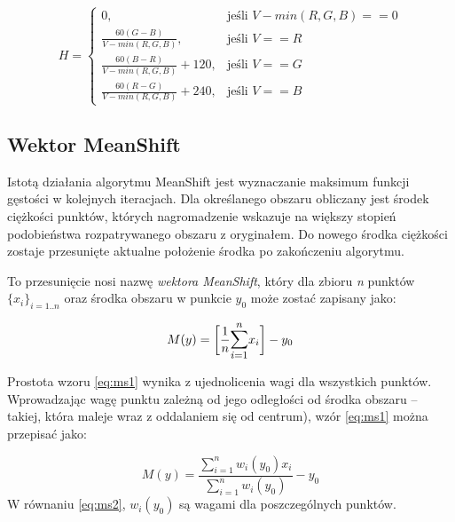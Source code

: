 \begin{equation}
\label{HSV_last}
H=\begin{cases}
	0, & \text{jeśli } V-min(R,G,B)==0 \\
	\frac{60(G-B)}{V-min(R,G,B)}, & \text{jeśli } V==R \\
	\frac{60(B-R)}{V-min(R,G,B)}+120, & \text{jeśli } V==G \\
	\frac{60(R-G)}{V-min(R,G,B)}+240, & \text{jeśli } V==B 
\end{cases}
\end{equation}



\subsection{Wektor MeanShift}
\label{ssec:MS}

Istotą działania algorytmu MeanShift jest wyznaczanie maksimum funkcji gęstości w kolejnych iteracjach. 
Dla określanego obszaru obliczany jest środek ciężkości punktów, których nagromadzenie wskazuje na większy stopień podobieństwa rozpatrywanego obszaru z oryginałem. Do nowego środka ciężkości zostaje przesunięte aktualne położenie środka po zakończeniu algorytmu. %

To przesunięcie nosi nazwę \textit{wektora MeanShift}, który dla zbioru \textit{n} punktów $\{x_{i}\}_{i=1..n}$ oraz środka obszaru w punkcie $y_0$ może zostać zapisany jako:

\begin{equation}
\label{eq:ms1}
M(y)=\bigg[\frac{1}{n}\mathlarger{\sum\limits_{i=1}^{n}}x_i\bigg]-y_0
\end{equation}

Prostota wzoru \eqref{eq:ms1} wynika z ujednolicenia wagi dla wszystkich punktów. %
Wprowadzając wagę punktu zależną od jego odległości od środka obszaru -- takiej, która maleje wraz z oddalaniem się od centrum), wzór \eqref{eq:ms1} można przepisać jako:

\begin{equation}
\label{eq:ms2}
M(y)=\frac{\sum_{i=1}^{n}w_i(y_0)x_i}{\sum_{i=1}^{n}w_i(y_0)}-y_0
\end{equation}
W równaniu \eqref{eq:ms2}, $w_i(y_0)$ są wagami dla poszczególnych punktów.

